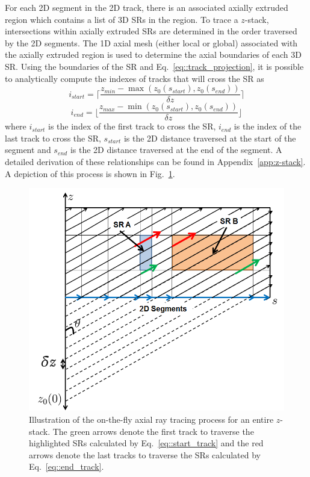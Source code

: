 For each 2D segment in the 2D track, there is an associated axially extruded region which contains a list of 3D \ac{SR}s in the region. To trace a $z$-stack, intersections within axially extruded \ac{SR}s are determined in the order traversed by the 2D segments. The 1D axial mesh (either local or global) associated with the axially extruded region is used to determine the axial boundaries of each 3D \ac{SR}. Using the boundaries of the \ac{SR} and Eq.~\ref{eq::track_projection}, it is possible to analytically compute the indexes of tracks that will cross the \ac{SR} as
\begin{equation}
i_{\textit{start}} = \Bigg\lceil\frac{z_{\textit{min}} - \max\left({z_0(s_{\textit{start}}), z_0(s_{\textit{end}})}\right) }{\delta z}\Bigg\rceil
\label{eq::start_track}
\end{equation}
\begin{equation}
i_{\textit{end}} = \Bigg\lfloor\frac{z_{\textit{max}} - \min\left({z_0(s_{\textit{start}}), z_0(s_{\textit{end}})}\right) }{\delta z}\Bigg\rfloor
\label{eq::end_track}
\end{equation}
where $i_{\textit{start}}$ is the index of the first track to cross the \ac{SR}, $i_{\textit{end}}$ is the index of the last track to cross the \ac{SR}, $s_{\textit{start}}$ is the 2D distance traversed at the start of the segment and $s_{\textit{end}}$ is the 2D distance traversed at the end of the segment. A detailed derivation of these relationships can be found in Appendix~\ref{app:z-stack}. A depiction of this process is shown in Fig.~\ref{fig::stack_tracing}.

\begin{figure}[ht!]
	\centering
	\includegraphics[width=0.75\linewidth]{figures/ph2016/stack_tracing.png}
	\caption{Illustration of the on-the-fly axial ray tracing process for an entire $z$-stack. The green arrows denote the first track to traverse the highlighted \ac{SR}s calculated by Eq.~\ref{eq::start_track} and the red arrows denote the last tracks to traverse the \ac{SR}s calculated by Eq.~\ref{eq::end_track}.}
	\label{fig::stack_tracing}
\end{figure}


